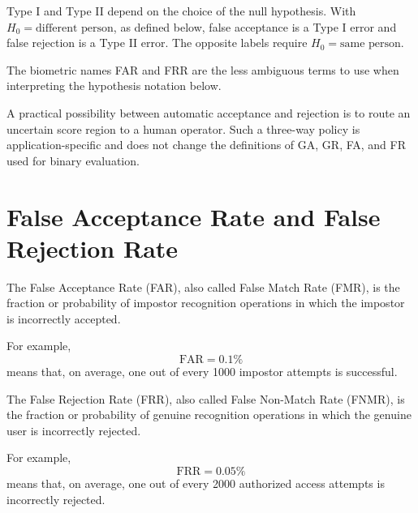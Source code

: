 \documentclass[11pt,a4paper,oneside]{report}
\begin{document}
\begin{remarkbox}
Type I and Type II depend on the choice of the null hypothesis.
With \(H_0=\text{different person}\), as defined below,
false acceptance is a Type I error and false rejection is a Type II error.
The opposite labels require \(H_0=\text{same person}\).

The biometric names FAR and FRR are the less ambiguous terms to use
when interpreting the hypothesis notation below.
\end{remarkbox}

\begin{remarkbox}
A practical possibility between automatic acceptance and rejection is to
route an uncertain score region to a human operator. Such a three-way policy is application-specific and does not change
the definitions of GA, GR, FA, and FR used for binary evaluation.
\end{remarkbox}

\section{False Acceptance Rate and False Rejection Rate}
\label{subsec:far-frr}

\noindent\begin{minipage}{\linewidth}
\setlength{\parskip}{0.50em}
\begin{metricbox}
The False Acceptance Rate (FAR), also called False Match Rate (FMR), is
the fraction or probability of impostor recognition operations in which
the impostor is incorrectly accepted.
\end{metricbox}

For example,
\[
\mathrm{FAR}=0.1\%
\]
\nopagebreak
means that, on average, one out of every 1000 impostor attempts is
successful.
\end{minipage}\par

\noindent\begin{minipage}{\linewidth}
\setlength{\parskip}{0.50em}
\begin{metricbox}
The False Rejection Rate (FRR), also called False Non-Match Rate (FNMR),
is the fraction or probability of genuine recognition operations in which
the genuine user is incorrectly rejected.
\end{metricbox}

For example,
\[
\mathrm{FRR}=0.05\%
\]
\nopagebreak
means that, on average, one out of every 2000 authorized access attempts
is incorrectly rejected.
\end{minipage}\par
\end{document}
